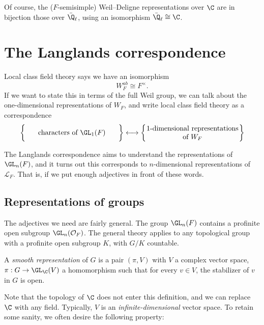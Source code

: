 \documentclass[a4paper]{article}
\begin{document}
Of course, the ($F$-semisimple) Weil--Deligne representations over $\C$ are in bijection those over $\bar{\Q}_\ell$, using an isomorphism $\bar{\Q}_\ell \cong \C$.

\section{The Langlands correspondence}
Local class field theory says we have an isomorphism
\[
  W_F^{ab} \cong F^\times.
\]
If we want to state this in terms of the full Weil group, we can talk about the one-dimensional representations of $W_F$, and write local class field theory as a correspondence
\[
   \left\{\parbox{4.6cm}{\centering characters of $\GL_1(F)$}\vphantom{\parbox{4.6cm}{\centering $1$-dimensional representations\\ of $W_F$}}\right\} \longleftrightarrow \left\{\parbox{4.6cm}{\centering $1$-dimensional representations\\ of $W_F$}\right\}
\]

The Langlands correspondence aims to understand the representations of $\GL_n(F)$, and it turns out this corresponds to $n$-dimensional representations of $\mathcal{L}_F$. That is, if we put enough adjectives in front of these words.

%

\subsection{Representations of groups}
The adjectives we need are fairly general. The group $\GL_n(F)$ contains a profinite open subgroup $\GL_n(\mathcal{O}_F)$. The general theory applies to any topological group with a profinite open subgroup $K$, with $G/K$ countable.

\begin{defi}
  A \emph{smooth representation} of $G$ is a pair $(\pi, V)$ with $V$ a complex vector space, $\pi: G \to \GL_\C(V)$ a homomorphism such that for every $v \in V$, the stabilizer of $v$ in $G$ is open.
\end{defi}
Note that the topology of $\C$ does not enter this definition, and we can replace $\C$ with any field. Typically, $V$ is an \emph{infinite-dimensional} vector space. To retain some sanity, we often desire the following property:
\end{document}
